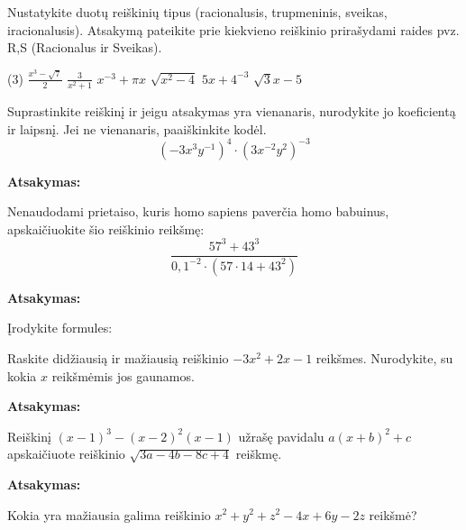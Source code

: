 \documentclass[12pt]{exam}
\newcommand{\atsakymas}{%
    \par\vspace{0.3cm}
    \textbf{Atsakymas:} \framebox[7cm]{\rule{0pt}{0.7cm}}
}
\begin{document}
\begin{questions}

\question[3] Nustatykite duotų reiškinių tipus (racionalusis, trupmeninis, sveikas, iracionalusis). Atsakymą pateikite prie kiekvieno reiškinio prirašydami raides pvz. R,S (Racionalus ir Sveikas).
\begin{tasks}[label-width=1.2em](3)
    \task $\displaystyle \frac{x^3 - \sqrt{7}}{2}$
    \task $\displaystyle \frac{3}{x^2 + 1}$
    \task $\displaystyle x^{-3} + \pi x$
    \task $\displaystyle \sqrt{x^2 - 4}$
    \task $\displaystyle 5x+4 ^{-3} $
    \task $\displaystyle \sqrt{3}x-5 $
\end{tasks}
\droppoints

\question[4] Suprastinkite reiškinį ir jeigu atsakymas yra vienanaris, nurodykite jo koeficientą ir laipsnį. Jei ne vienanaris, paaiškinkite kodėl.
$$ \left( -3x^3y^{-1} \right)^4 \cdot \left( 3x^{-2}y^2 \right)^{-3} $$
\droppoints
\vspace{2.5cm}
\atsakymas

\question[4] Nenaudodami prietaiso, kuris homo sapiens paverčia homo babuinus, apskaičiuokite šio reiškinio reikšmę:
 $$\displaystyle \frac{57^3 + 43^3}{0,1 ^{-2} \cdot (57 \cdot 14+43 ^{2} ) } $$ \droppoints
\vspace{3.5cm}
\atsakymas

\question Įrodykite formules:
\newpage

\question[4] Raskite didžiausią ir mažiausią reiškinio $-3x^2 + 2 x - 1$ reikšmes. Nurodykite, su kokia $x$ reikšmėmis jos gaunamos.
\droppoints
\vspace{3.5cm}
\atsakymas

\question[5]  Reiškinį $(x-1) ^{3} -(x-2) ^{2} (x-1)$ užrašę pavidalu $a(x+b)^{2} + c$ apskaičiuote reiškinio $\sqrt{3a-4b-8c+4} $ reiškmę.   
\droppoints
\vspace{3.5cm}
\atsakymas

\question[4] Kokia yra mažiausia galima reiškinio $x ^{2} +y ^{2} + z ^{2} -4x+6y-2z$ reikšmė? 
\droppoints
\vspace{1cm} %

\end{questions}
\end{document}
